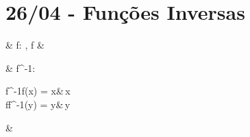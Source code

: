 \part{26/04 - Funções Inversas}


\begin{BM}[align*][\Large]
&
	f:\to{}
\land
	,  \subset {}
\land
	f 
&
\end{BM}\relax

\begin{BM}[align*][\Large]
&
	f^{-1}:  \to {}
	\quad 
	\begin{cases}
		f^{-1}\circ f(x) = x&\quad\forall\,x\in{}
	\\	f\circ f^{-1}(y) = y&\quad\forall\,y\in{}
	\end{cases}
&
\end{BM}
\label{função inversa}

\vspace{5mm}

